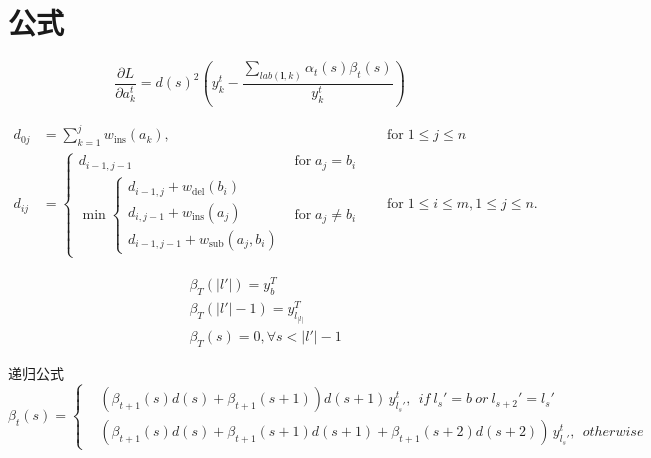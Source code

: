 \documentclass[winfonts, thesis]{njuthesis}
\begin{document}
\newpage %


\section{公式}

\begin{equation}
  \frac{\partial L}{\partial a_{k}^t} = {d(s)}^2 (y_{k}^t - \frac{\sum_{lab(\mathbf{l},k)} \alpha_t(s)\beta_t(s) }{y_{k}^t} )
\end{equation}

\begin{equation}
  \begin{aligned}
    d_{{0j}} & =\sum _{{k=1}}^{{j}}w_{{\mathrm  {ins}}}(a_{{k}}),\quad & {\text{for}}\;1\leq j\leq n                \\
    d_{{ij}} & ={\begin{cases}d_{{i-1,j-1}}&{\text{for}}\;a_{{j}}=b_{{i}}\\\min {\begin{cases}d_{{i-1,j}}+w_{{\mathrm  {del}}}(b_{{i}})\\d_{{i,j-1}}+w_{{\mathrm  {ins}}}(a_{{j}})\\d_{{i-1,j-1}}+w_{{\mathrm  {sub}}}(a_{{j}},b_{{i}})\end{cases}}&{\text{for}}\;a_{{j}}\neq b_{{i}}\end{cases}}\quad                      & {\text{for}}\;1\leq i\leq m,1\leq j\leq n.
  \end{aligned}
\end{equation}

\begin{equation}
  \begin{aligned}
     & \beta_T(|l{}'|)=y_{b}^{T}          \\
     & \beta_T(|l{}'|-1)=y_{l_|l|}^{T}    \\
     & \beta_T(s)=0, \forall s < |l{}'|-1
  \end{aligned}
\end{equation}

递归公式
\begin{equation}
  \beta_t(s)=\left\{
  \begin{aligned}
     & (\beta_{t+1}(s) d(s)+\beta_{t+1}(s+1))d(s+1)\,  y_{l_s{}'}^t, \: \: if \:  l_s{}'=b \:  or \:  l_{s+2}{}'=l_s{}' \\
     & (\beta_{t+1}(s) d(s)+\beta_{t+1}(s+1)d(s+1)+\beta_{t+1}(s+2)d(s+2))\,  y_{l_s{}'}^t,\: \:   otherwise
  \end{aligned}
  \right.
\end{equation}
\end{document}
